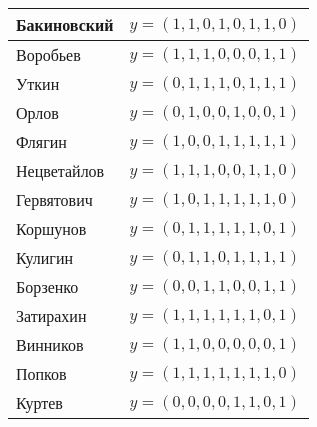 \documentclass[11pt]{exam}
\theoremstyle{definition}
\begin{document}
{\begin{center}
 		\begin{tabular}{l  | c }
 			Бакиновский & $y =(1, 1, 0, 1, 0, 1, 1, 0)$\\ \hline
 			Воробьев  & $y =  (1, 1, 1, 0, 0, 0, 1, 1)$\\ \hline
 			Уткин   & $y =  (0, 1, 1, 1, 0, 1, 1, 1)$\\ \hline
 			Орлов &  $y =  (0, 1, 0, 0, 1, 0, 0, 1)$\\  \hline
 			Флягин &$y =  (1, 0, 0, 1, 1, 1, 1, 1)$ \\  \hline
 			Нецветайлов &  $y =  (1, 1, 1, 0, 0, 1, 1, 0)$\\  \hline
 			Гервятович  &  $y = (1, 0, 1, 1, 1, 1, 1, 0)$\\  \hline
 			Коршунов & $y =  (0, 1, 1, 1, 1, 1, 0, 1)$\\  \hline
 			Кулигин   & $y =  (0, 1, 1, 0, 1, 1, 1, 1)$\\  \hline
 			Борзенко  &$y =  (0, 0, 1, 1, 0, 0, 1, 1)$ \\  \hline
 			Затирахин  & $y =  (1, 1, 1, 1, 1, 1, 0, 1)$\\  \hline
 			Винников & $y =  (1, 1, 0, 0, 0, 0, 0, 1)$ \\  \hline
 			Попков &  $y = (1, 1, 1, 1, 1, 1, 1, 0)$\\  \hline
 			Куртев & $y =  (0, 0, 0, 0, 1, 1, 0, 1)$ \\  \hline
 		\end{tabular}
 	\end{center}

 	
 		\newpage
 		
}
\end{document}
